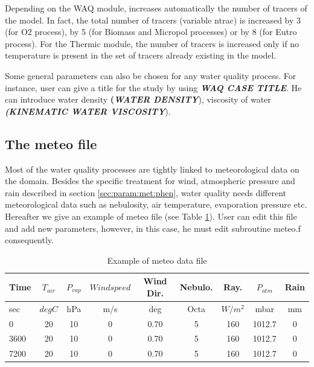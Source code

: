  Depending on the WAQ module,  increases automatically the number of tracers of the model. In fact, the total number of tracers (variable ntrac) is increased by 3 (for O2 process), by 5 (for Biomass and Micropol processes) or by 8 (for Eutro process). For the Thermic module, the number of tracers is increased only if no temperature is present in the set of tracers already existing in the model.

 Some general parameters can also be chosen for any water quality process. For instance, user can give a title for the study by using \textbf{\textit{WAQ CASE TITLE}}. He can introduce water density \textbf{(\textit{WATER DENSITY}}), viscosity of water \textbf{\textit{(KINEMATIC WATER VISCOSITY}}).


\subsection{  The meteo file}
\label{subs:meteo:file}
 Most of the water quality processes are tightly linked to meteorological data on the domain. Besides the specific treatment for wind, atmospheric pressure and rain described in section \ref{sec:param:met:phen}, water quality needs different meteorological data such as nebulosity, air temperature, evaporation pressure etc. Hereafter we give an example of meteo file (see Table \ref{tab:meteo}). User can edit this file and add new parameters, however, in this case, he must edit subroutine meteo.f consequently.

\begin{table}
    \centering
  \begin{tabular}{|l|c|c|c|c|c|c|c|c|}
     \hline \hline
     Time & $T_{air}$ & $P_{vap}$ & $Wind speed$ & Wind Dir. & Nebulo. & Ray. & $P_{atm}$ & Rain \\
     \hline \hline
     sec & $deg C $ & hPa & m/s & deg & Octa & $W/m^2$ & mbar & mm \\
     \hline \hline
     0 & 20 & 10 & 0 & 0.70 & 5 & 160 & 1012.7 & 0 \\
     3600 & 20 & 10 & 0 & 0.70 & 5 & 160 & 1012.7 & 0 \\
     7200 & 20 & 10 & 0 & 0.70 & 5 & 160 & 1012.7 & 0 \\
     \hline
   \end{tabular}
  \caption{Example of meteo data file }\label{tab:meteo}
\end{table}


